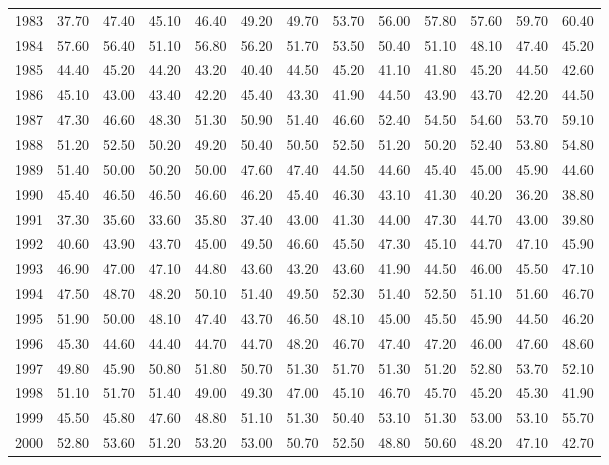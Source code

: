 \begin{longtable}{rrrrrrrrrrrrr}
  1983 & 37.70 & 47.40 & 45.10 & 46.40 & 49.20 & 49.70 & 53.70 & 56.00 & 57.80 & 57.60 & 59.70 & 60.40 \\ 
  1984 & 57.60 & 56.40 & 51.10 & 56.80 & 56.20 & 51.70 & 53.50 & 50.40 & 51.10 & 48.10 & 47.40 & 45.20 \\ 
  1985 & 44.40 & 45.20 & 44.20 & 43.20 & 40.40 & 44.50 & 45.20 & 41.10 & 41.80 & 45.20 & 44.50 & 42.60 \\ 
  1986 & 45.10 & 43.00 & 43.40 & 42.20 & 45.40 & 43.30 & 41.90 & 44.50 & 43.90 & 43.70 & 42.20 & 44.50 \\ 
  1987 & 47.30 & 46.60 & 48.30 & 51.30 & 50.90 & 51.40 & 46.60 & 52.40 & 54.50 & 54.60 & 53.70 & 59.10 \\ 
  1988 & 51.20 & 52.50 & 50.20 & 49.20 & 50.40 & 50.50 & 52.50 & 51.20 & 50.20 & 52.40 & 53.80 & 54.80 \\ 
  1989 & 51.40 & 50.00 & 50.20 & 50.00 & 47.60 & 47.40 & 44.50 & 44.60 & 45.40 & 45.00 & 45.90 & 44.60 \\ 
  1990 & 45.40 & 46.50 & 46.50 & 46.60 & 46.20 & 45.40 & 46.30 & 43.10 & 41.30 & 40.20 & 36.20 & 38.80 \\ 
  1991 & 37.30 & 35.60 & 33.60 & 35.80 & 37.40 & 43.00 & 41.30 & 44.00 & 47.30 & 44.70 & 43.00 & 39.80 \\ 
  1992 & 40.60 & 43.90 & 43.70 & 45.00 & 49.50 & 46.60 & 45.50 & 47.30 & 45.10 & 44.70 & 47.10 & 45.90 \\ 
  1993 & 46.90 & 47.00 & 47.10 & 44.80 & 43.60 & 43.20 & 43.60 & 41.90 & 44.50 & 46.00 & 45.50 & 47.10 \\ 
  1994 & 47.50 & 48.70 & 48.20 & 50.10 & 51.40 & 49.50 & 52.30 & 51.40 & 52.50 & 51.10 & 51.60 & 46.70 \\ 
  1995 & 51.90 & 50.00 & 48.10 & 47.40 & 43.70 & 46.50 & 48.10 & 45.00 & 45.50 & 45.90 & 44.50 & 46.20 \\ 
  1996 & 45.30 & 44.60 & 44.40 & 44.70 & 44.70 & 48.20 & 46.70 & 47.40 & 47.20 & 46.00 & 47.60 & 48.60 \\ 
  1997 & 49.80 & 45.90 & 50.80 & 51.80 & 50.70 & 51.30 & 51.70 & 51.30 & 51.20 & 52.80 & 53.70 & 52.10 \\ 
  1998 & 51.10 & 51.70 & 51.40 & 49.00 & 49.30 & 47.00 & 45.10 & 46.70 & 45.70 & 45.20 & 45.30 & 41.90 \\ 
  1999 & 45.50 & 45.80 & 47.60 & 48.80 & 51.10 & 51.30 & 50.40 & 53.10 & 51.30 & 53.00 & 53.10 & 55.70 \\ 
  2000 & 52.80 & 53.60 & 51.20 & 53.20 & 53.00 & 50.70 & 52.50 & 48.80 & 50.60 & 48.20 & 47.10 & 42.70 \\ 

\end{longtable}
